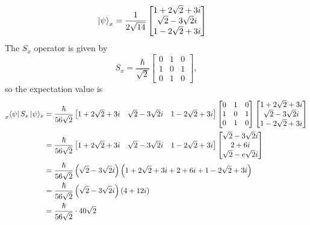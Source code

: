 \documentclass[11pt]{article}
\begin{document}
\begin{enumerate}[label=\textbf{\arabic*.}]
{\begin{enumerate}[label=\textbf{(\alph*)}]
{\begin{align*}
                        \ket{\psi}_x&=\frac{1}{2\sqrt{14}}\begin{bmatrix}1+2\sqrt 2+3i \\ \sqrt 2-3\sqrt 2 i \\ 1-2\sqrt 2+3i\end{bmatrix}
                    \end{align*}
                    The \(S_x\) operator is given by
                    \begin{equation*}
                        S_x=\frac{\hbar}{\sqrt 2}\begin{bmatrix}0 & 1 & 0 \\ 1 & 0 & 1 \\ 0 & 1 & 0\end{bmatrix},
                    \end{equation*}
                    so the expectation value is
                    \begin{align*}
                        \prescript{}{x}{\bra{\psi}S_x\ket{\psi}}_x&=\frac{\hbar}{56\sqrt2}\begin{bmatrix}1+2\sqrt 2+3i & \sqrt 2-3\sqrt 2 i & 1-2\sqrt 2+3i\end{bmatrix}\begin{bmatrix}0 & 1 & 0 \\ 1 & 0 & 1 \\ 0 & 1 & 0\end{bmatrix}\begin{bmatrix}1+2\sqrt 2+3i \\ \sqrt 2-3\sqrt 2 i \\ 1-2\sqrt 2+3i\end{bmatrix} \\
                        &=\frac{\hbar}{56\sqrt2}\begin{bmatrix}1+2\sqrt 2+3i & \sqrt 2-3\sqrt 2 i & 1-2\sqrt 2+3i\end{bmatrix}\begin{bmatrix}\sqrt 2-3\sqrt 2i \\ 2+6i \\ \sqrt 2-e\sqrt 2i\end{bmatrix} \\
                        &=\frac{\hbar}{56\sqrt2}\left(\sqrt2-3\sqrt2i\right)\left(1+2\sqrt2+3i+2+6i+1-2\sqrt2+3i\right) \\
                        &=\frac{\hbar}{56\sqrt2}\left(\sqrt2-3\sqrt2i\right)(4+12i) \\
                        &=\frac{\hbar}{56\sqrt2}\cdot40\sqrt2 \\

\end{align*}}
\end{enumerate}}
\end{enumerate}
\end{document}
